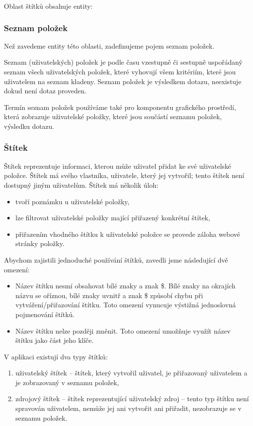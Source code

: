 Oblast štítků obsahuje entity:

\subsubsection{Seznam položek}
Než zavedeme entity této oblasti, zadefinujeme pojem seznam položek.

Seznam (uživatelských) položek je podle času vzestupně či sestupně uspořádaný seznam všech uživatelských položek, které vyhovují všem kritériím, které jsou uživatelem na seznam kladeny.
Seznam položek je výsledkem dotazu, neexistuje dokud není dotaz proveden.

Termín seznam položek používáme také pro komponentu grafického prostředí, která zobrazuje uživatelské položky, které jsou součástí seznamu položek, výsledku dotazu.

\subsubsection{Štítek}
\label{sss:stitek}

Štítek reprezentuje informaci, kterou může uživatel přidat ke své uživatelské položce.
Štítek má svého vlastníka, uživatele, který jej vytvořil; tento štítek není dostupný jiným uživatelům.
Štítek má několik úloh:
\begin{itemize}
	\item tvoří poznámku u uživatelské položky,
	\item lze filtrovat uživatelské položky mající přiřazený konkrétní štítek,
	\item přiřazením vhodného štítku k uživatelské položce se provede záloha webové stránky položky.
\end{itemize}

Abychom zajistili jednoduché používání štítků, zavedli jsme následující dvě omezení:
\begin{itemize}
	\item Název štítku nesmí obsahovat bílé znaky a znak \$.
		Bílé znaky na okrajích názvu se oříznou, bílé znaky uvnitř a znak \$ způsobí chybu při vytváření/přiřazování štítku.
		Toto omezení vynucuje výstižná jednoslovná pojmenování štítků.
	\item Název štítku nelze později změnit.
		Toto omezení umožňuje využít název štítku jako část jeho klíče.
\end{itemize}

V aplikaci existují dva typy štítků:
\begin{enumerate}
	\item uživatelský štítek -- štítek, který vytvořil uživatel, je přiřazovaný uživatelem a je zobrazovaný v seznamu položek,
	\item zdrojový štítek -- štítek reprezentující uživatelský zdroj -- tento typ štítku není spravován uživatelem, nemůže jej ani vytvořit ani přiřadit, nezobrazuje se v seznamu položek.
\end{enumerate}

